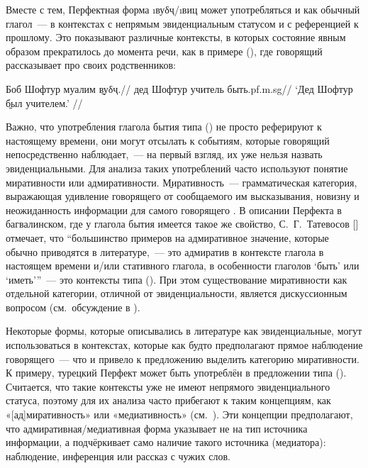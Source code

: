{{{Вместе с тем, Перфектная форма \i{вуδҷ}/\i{виц} может употребляться и как обычный глагол~— в контекстах с непрямым эвиденциальным статусом и с референцией к прошлому. Это показывают различные контексты, в которых состояние явным образом прекратилось до момента речи, как в примере (), где говорящий рассказывает про своих родственников:

\begingl
\gla Боб Шофтур муалим \b{вуδҷ}.//
\glc дед Шофтур учитель быть.{\sc pf.m.sg}//
\glft ‘Дед Шофтур \b{был} учителем.’ //
\endgl \xe

Важно, что употребления глагола бытия типа () не просто реферируют к настоящему времени, они могут отсылать к событиям, которые говорящий непосредственно наблюдает,~— на первый взгляд, их уже нельзя назвать эвиденциальными. Для анализа таких употреблений часто используют понятие миративности или адмиративности. \b{Миративность}~— грамматическая категория, выражающая удивление говорящего от сообщаемого им высказывания, новизну и неожиданность информации для самого говорящего \parencite{delancey2001}. В описании Перфекта в багвалинском, где у глагола бытия имеется такое же свойство, С.~Г.~Татевосов [\cite*[380]{tatevosov2007}] отмечает, что “большинство примеров на адмиративное значение, которые обычно приводятся в литературе,~— это адмиратив в контексте глагола в настоящем времени и/или стативного глагола, в особенности глаголов ‘быть’ или ‘иметь’”~— это контексты типа (). При этом существование миративности как отдельной категории, отличной от эвиденциальности, является дискуссионным вопросом (см.~обсуждение в \parencites{lazard1999}{hill2012}{delancey2012}).

Некоторые формы, которые описывались в литературе как эвиденциальные, могут использоваться в контекстах, которые как будто предполагают прямое наблюдение говорящего~— что и привело к предложению выделить категорию миративности. К примеру, турецкий Перфект может быть употреблён в предложении типа (). Считается, что такие контексты уже не имеют непрямого эвиденциального статуса, поэтому для их анализа часто прибегают к таким концепциям, как «[ад]миративность» или «медиативность» (см.~\parencite{lazard1999}). Эти концепции предполагают, что адмиративная/медиативная форма указывает не на тип источника информации, а подчёркивает само наличие такого источника (медиатора): наблюдение, инференция или рассказ с чужих слов.

}}}
